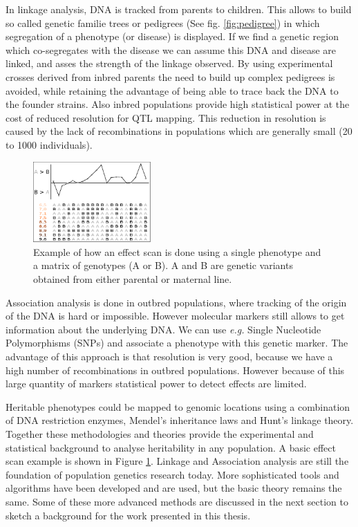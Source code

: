 In linkage analysis, DNA is tracked from parents to children. This allows to build so called 
genetic familie trees or pedigrees (See fig. \ref{fig:pedigree}) in which segregation of a phenotype (or 
disease) is displayed. If we find a genetic region which co-segregates with the disease we can assume this DNA and 
disease are linked, and asses the strength of the linkage observed. By using experimental 
crosses derived from inbred parents the need to build up complex pedigrees is avoided, while 
retaining the advantage of being able to trace back the DNA to the founder strains. Also inbred 
populations provide high statistical power at the cost of reduced resolution for QTL mapping. 
This reduction in resolution is caused by the lack of recombinations in populations which are 
generally small (20 to 1000 individuals).

\begin{figure}
  \centering
  \includegraphics[width=0.4\textwidth]{eps/image_1_1}
  \caption[Effect scan across the genome.]
    {Example of how an effect scan is done using a single phenotype and a matrix of genotypes (A or B).
    A and B are genetic variants obtained from either parental or maternal line. }
    \label{fig:effectscan}
\end{figure}

Association analysis is done in outbred populations, where tracking of the origin of the 
DNA is hard or impossible. However molecular markers still allows to get information 
about the underlying DNA. We can use \emph{e.g.} Single Nucleotide Polymorphisms (SNPs) and associate 
a phenotype with this genetic marker. The advantage of this approach is that resolution is 
very good, because we have a high number of recombinations in outbred populations. However 
because of this large quantity of markers statistical power to detect effects are limited.

Heritable phenotypes could be mapped to genomic locations using a combination of DNA 
restriction enzymes, Mendel's inheritance laws and Hunt's linkage theory. Together these 
methodologies and theories provide the experimental and statistical background to 
analyse heritability in any population. A basic effect scan example is shown in Figure 
\ref{fig:effectscan}. Linkage and Association analysis are still the foundation of population 
genetics research today. More sophisticated tools and algorithms have been developed and are 
used, but the basic theory remains the same. Some of these more advanced methods are discussed 
in the next section to sketch a background for the work presented in this thesis.

